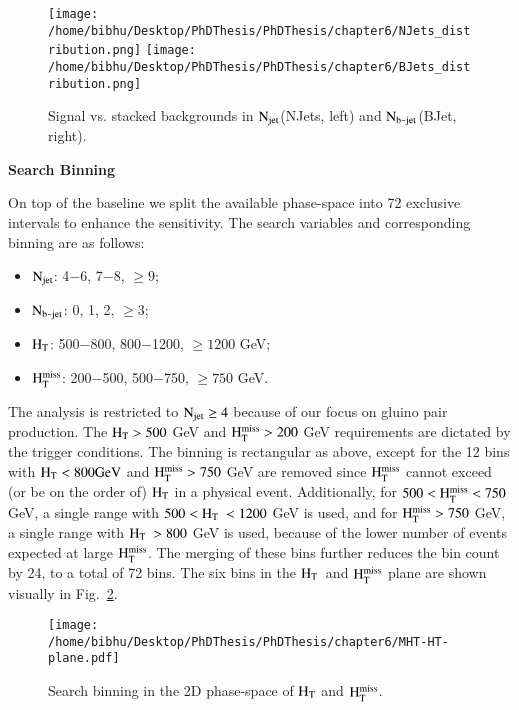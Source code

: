 \begin{itemize}
\begin{figure}[h]
\begin{center}
\texttt{[image: /home/bibhu/Desktop/PhDThesis/PhDThesis/chapter6/NJets\_distribution.png]}
\texttt{[image: /home/bibhu/Desktop/PhDThesis/PhDThesis/chapter6/BJets\_distribution.png]}
\caption{\label{fig:SigvsBkgSearchVariables2Thesis} Signal vs. stacked backgrounds in $\rm N_{jet}$(NJets, left) and $\rm N_{b\texttt{-}jet}$(BJet, right).}
\end{center}
\end{figure}


\end{itemize}

  {\bf Search Binning}


On top of the baseline we split the available phase-space into 72 exclusive intervals to enhance the sensitivity. The search variables and corresponding binning are as follows:
\begin{itemize}
\item $\rm N_{jet}$: 4$-$6, 7$-$8, $\geq 9$;
\item $\rm N_{b\texttt{-}jet}$: 0, 1, 2, $\geq 3$;
\item $\rm H_{T}$: 500$-$800, 800$-$1200, $\geq 1200$ GeV;
\item $\rm H_{T}^{miss}$: 200$-$500, 500$-$750, $\geq 750$ GeV.
\end{itemize}
The analysis is restricted to $\rm N_{jet}\geq 4$ because of our focus
on gluino pair production. The $\rm H_{T}>500 $ GeV and $\rm H_{T}^{miss}>200$ GeV requirements
are dictated by the trigger conditions. The binning is rectangular as above, except for the 12 bins with $\rm H_{T} < 800 GeV$ 
and $\rm H_{T}^{miss} > 750$ GeV are removed since $\rm H_{T}^{miss}$ cannot exceed (or be on the order of) $\rm H_{T}$
in a physical event. Additionally, for $\rm 500 <  H_{T}^{miss} < 750$ GeV, a single range with $\rm 500 <  H_{T}\ < 1200$ GeV is used, and
for $\rm H_{T}^{miss} > 750$ GeV, a single range with $\rm H_{T}\ > 800$ GeV is used,
because of the lower number of events expected at large $\rm H_{T}^{miss}$. The merging of these bins further
reduces the bin count by 24, to a total of 72 bins. The six bins in the $\rm H_{T}$\ and $\rm H_{T}^{miss}$ plane are
shown visually in Fig.~\ref{fig:HT-MHT}.


\begin{figure}[h]
\begin{center}
\texttt{[image: /home/bibhu/Desktop/PhDThesis/PhDThesis/chapter6/MHT-HT-plane.pdf]}

\caption{\label{fig:HT-MHT} Search binning in the 2D phase-space of $\rm H_{T}$ and $\rm H_{T}^{miss}$.}
\end{center}
\end{figure}






